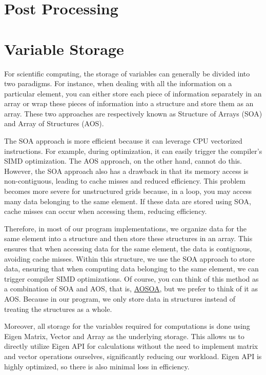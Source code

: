 \documentclass{develop-note}
\begin{document}
\section{Post Processing}


\section{Variable Storage}


For scientific computing, the storage of variables can generally be divided into two paradigms. For instance, when dealing with all the information on a particular element, you can either store each piece of information separately in an array or wrap these pieces of information into a structure and store them as an array. These two approaches are respectively known as Structure of Arrays (SOA) and Array of Structures (AOS).

The SOA approach is more efficient because it can leverage CPU vectorized instructions. For example, during optimization, it can easily trigger the compiler's SIMD optimization. The AOS approach, on the other hand, cannot do this. However, the SOA approach also has a drawback in that its memory access is non-contiguous, leading to cache misses and reduced efficiency. This problem becomes more severe for unstructured grids because, in a loop, you may access many data belonging to the same element. If these data are stored using SOA, cache misses can occur when accessing them, reducing efficiency.

Therefore, in most of our program implementations, we organize data for the same element into a structure and then store these structures in an array. This ensures that when accessing data for the same element, the data is contiguous, avoiding cache misses. Within this structure, we use the SOA approach to store data, ensuring that when computing data belonging to the same element, we can trigger compiler SIMD optimizations. Of course, you can think of this method as a combination of SOA and AOS, that is, \href{https://en.wikipedia.org/wiki/AoS_and_SoA}{AOSOA}, but we prefer to think of it as AOS. Because in our program, we only store data in structures instead of treating the structures as a whole.

Moreover, all storage for the variables required for computations is done using Eigen Matrix, Vector and Array as the underlying storage. This allows us to directly utilize Eigen API for calculations without the need to implement matrix and vector operations ourselves, significantly reducing our workload. Eigen API is highly optimized, so there is also minimal loss in efficiency.
\end{document}
